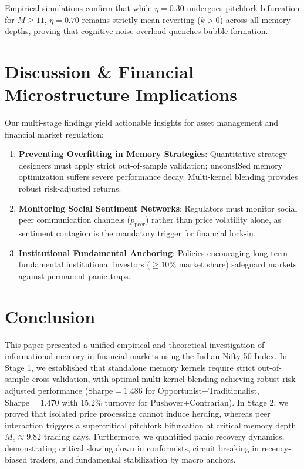 \documentclass[11pt,a4paper]{article}
\begin{document}
Empirical simulations confirm that while $\eta = 0.30$ undergoes pitchfork bifurcation for $M \ge 11$, $\eta = 0.70$ remains strictly mean-reverting ($k > 0$) across all memory depths, proving that cognitive noise overload quenches bubble formation.

\section{Discussion \& Financial Microstructure Implications}

Our multi-stage findings yield actionable insights for asset management and financial market regulation:
\begin{enumerate}
    \item \textbf{Preventing Overfitting in Memory Strategies}: Quantitative strategy designers must apply strict out-of-sample validation; unconsISed memory optimization suffers severe performance decay. Multi-kernel blending provides robust risk-adjusted returns.
    \item \textbf{Monitoring Social Sentiment Networks}: Regulators must monitor social peer communication channels ($p_{\text{peer}}$) rather than price volatility alone, as sentiment contagion is the mandatory trigger for financial lock-in.
    \item \textbf{Institutional Fundamental Anchoring}: Policies encouraging long-term fundamental institutional investors ($\ge 10\%$ market share) safeguard markets against permanent panic traps.
\end{enumerate}

\section{Conclusion}

This paper presented a unified empirical and theoretical investigation of informational memory in financial markets using the Indian Nifty 50 Index. In Stage 1, we established that standalone memory kernels require strict out-of-sample cross-validation, with optimal multi-kernel blending achieving robust risk-adjusted performance ($\text{Sharpe} = 1.486$ for Opportunist+Traditionalist, $\text{Sharpe} = 1.470$ with $15.2\%$ turnover for Pushover+Contrarian). In Stage 2, we proved that isolated price processing cannot induce herding, whereas peer interaction triggers a supercritical pitchfork bifurcation at critical memory depth $M_c \approx 9.82$ trading days. Furthermore, we quantified panic recovery dynamics, demonstrating critical slowing down in conformists, circuit breaking in recency-biased traders, and fundamental stabilization by macro anchors.
\end{document}
